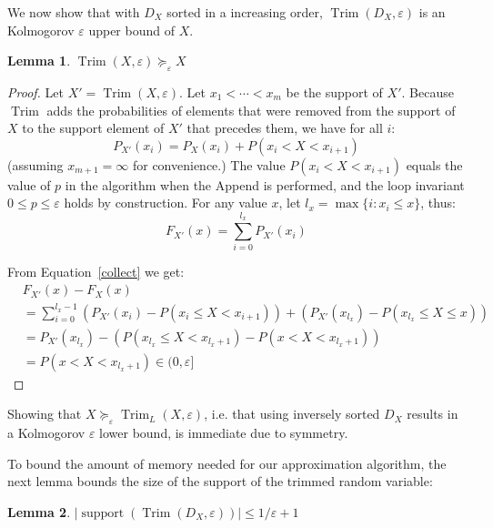 \documentclass[review]{elsarticle}
\newtheorem{lemma}{Lemma}
\DeclareMathOperator{\Trim}{Trim}
\begin{document}
\noindent We now show that with $D_X$ sorted in a increasing order,
$\Trim(D_X,\varepsilon)$ is an Kolmogorov $\varepsilon$ upper bound of $X$.
\begin{lemma} \label{Trim}
$\Trim(X,\varepsilon)\succeq_\varepsilon X$
\end{lemma}

\begin{proof}
Let $X'=\Trim(X,\varepsilon)$. 
Let $x_1{<}\cdots{<}x_m$ be the support of $X'$. 
Because $\Trim$ adds the probabilities of elements that were removed from the support of $X$ 
to the support element of $X'$ that precedes them, 
we have for all $i$:
\begin{equation}
P_{X'}(x_i) = P_X(x_i) +  P(x_i < X < x_{i+1})
\label{collect}
\end{equation}
(assuming $x_{m+1} = \infty$ for convenience.)
The value $P(x_i < X < x_{i+1})$ equals the value of $p$ in
the algorithm when the Append is performed, and  the loop invariant $0 \leq p \leq \varepsilon$ holds by construction.
For any value $x$, let $l_x=\max\{ i \colon x_i\leq x\}$, thus:
\[
F_{X'}(x) = \sum_{i=0}^{l_x} P_{X'}(x_i)
\]

From Equation~\eqref{collect} we get:
{
\begin{align*}
&F_{X'}(x) - F_{X}(x)  \\
 &{=} \sum_{i=0}^{l_x-1} (P_{X'}(x_i)- P(x_i\leq X <x_{i+1})) +(P_{X'}(x_{l_x})-P(x_{l_x} \leq X \leq x)) \\%
&{=}P_{X'}(x_{l_x}) {-} (P(x_{l_x} {\leq} X {<} x_{l_x+1}) {-} P(x {<} X {<} x_{l_x+1})) \\
&{=}P(x < X < x_{l_x+1}) \in (0,\varepsilon]
\end{align*}}
\end{proof}
%
Showing that $X \succeq_\varepsilon \Trim_L(X,\varepsilon)$, i.e. that using inversely sorted $D_X$ results in a Kolmogorov $\varepsilon$ lower bound, is immediate due to symmetry.

To bound the amount of memory needed for our approximation algorithm,
the next lemma bounds the size of the support of the trimmed random variable:


\begin{lemma} \label{SizeD}
$|\operatorname{support}(\Trim(D_X,\varepsilon))| \leq 1/\varepsilon +1$
\end{lemma}
\end{document}
